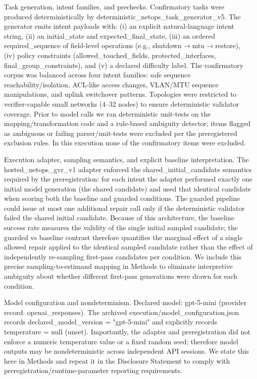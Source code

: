 \documentclass[conference]{IEEEtran}
\begin{document}
Task generation, intent families, and prechecks. Confirmatory tasks were produced deterministically by deterministic\_netops\_task\_generator\_v5. The generator emits intent payloads with: (i) an explicit natural-language intent string, (ii) an initial\_state and expected\_final\_state, (iii) an ordered required\_sequence of field-level operations (e.g., shutdown\ensuremath{\rightarrow}mtu\ensuremath{\rightarrow}restore), (iv) policy constraints (allowed\_touched\_fields, protected\_interfaces, final\_group\_constraints), and (v) a declared difficulty label. The confirmatory corpus was balanced across four intent families: safe sequence reachability/isolation, ACL-like access changes, VLAN/MTU sequence manipulations, and uplink switchover patterns. Topologies were restricted to verifier-capable small networks (4--32 nodes) to ensure deterministic validator coverage. Prior to model calls we ran deterministic unit-tests on the mapping/transformation code and a rule-based ambiguity detector; items flagged as ambiguous or failing parser/unit-tests were excluded per the preregistered exclusion rules. In this execution none of the confirmatory items were excluded.

Execution adapter, sampling semantics, and explicit baseline interpretation. The hosted\_netops\_gvr\_v1 adapter enforced the shared\_initial\_candidate semantics required by the preregistration: for each intent the adapter performed exactly one initial model generation (the shared candidate) and used that identical candidate when scoring both the baseline and guarded conditions. The guarded pipeline could issue at most one additional repair call only if the deterministic validator failed the shared initial candidate. Because of this architecture, the baseline success rate measures the validity of the single initial sampled candidate; the guarded vs baseline contrast therefore quantifies the marginal effect of a single allowed repair applied to the identical sampled candidate rather than the effect of independently re-sampling first-pass candidates per condition. We include this precise sampling-to-estimand mapping in Methods to eliminate interpretive ambiguity about whether different first-pass generations were drawn for each condition.

Model configuration and nondeterminism. Declared model: gpt-5-mini (provider record: openai\_responses). The archived execution/model\_configuration.json records declared\_model\_version = "gpt-5-mini" and explicitly records temperature = null (unset). Importantly, the adapter and preregistration did not enforce a numeric temperature value or a fixed random seed; therefore model outputs may be nondeterministic across independent API sessions. We state this here in Methods and repeat it in the Disclosure Statement to comply with preregistration/runtime-parameter reporting requirements.
\end{document}
